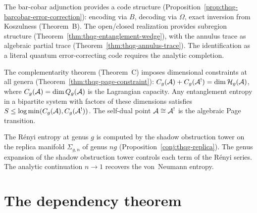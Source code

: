 \begin{theorem}\ClaimStatusProvedHere
\label{thm:thqg-g14-error-correction}
The bar-cobar adjunction provides a code structure
(Proposition~\ref{prop:thqg-barcobar-error-correction}):
encoding via $B$, decoding via $\Omega$, exact inversion from
Koszulness (Theorem~B). The open/closed realization provides
subregion structure (Theorem~\ref{thm:thqg-entanglement-wedge}),
with the annulus trace as algebraic partial trace
(Theorem~\ref{thm:thqg-annulus-trace}).
The identification as a literal quantum error-correcting code
requires the analytic completion.
\end{theorem}

\begin{theorem}\ClaimStatusProvedHere
\label{thm:thqg-g15-page}
The complementarity theorem (Theorem~C) imposes dimensional constraints
at all genera (Theorem~\ref{thm:thqg-page-constraint}):
$C_g(\mathcal{A}) + C_g(\mathcal{A}^!) = \dim\mathcal{H}_g(\mathcal{A})$, where $C_g(\mathcal{A}) = \dim Q_g(\mathcal{A})$
is the Lagrangian capacity. Any entanglement entropy in a bipartite system
with factors of these dimensions satisfies
$S \le \log\min(C_g(\mathcal{A}), C_g(\mathcal{A}^!))$.
The self-dual point $\mathcal{A} \cong \mathcal{A}^!$ is the algebraic Page transition.
\end{theorem}

\begin{conjecture}
\label{conj:thqg-g16-replica}
The R\'enyi entropy at genus $g$ is computed by the shadow obstruction tower
on the replica manifold $\Sigma_{g,n}$ of genus $ng$
(Proposition~\ref{conj:thqg-replica}).
The genus expansion of the shadow obstruction tower controls each term of the
R\'enyi series. The analytic continuation $n \to 1$ recovers the
von~Neumann entropy.
\end{conjecture}

\section{The dependency theorem}
\label{sec:thqg-dependency-theorem}

